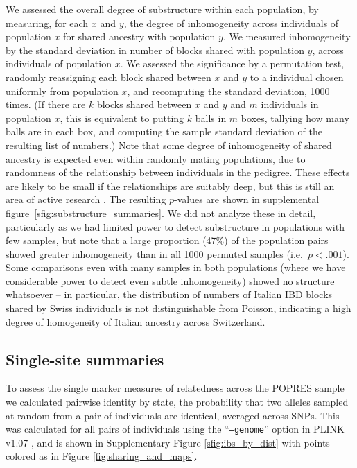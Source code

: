 \documentclass{article}
\begin{document}
We assessed the overall degree of substructure within each population, 
by measuring, for each $x$ and $y$, the degree of inhomogeneity across individuals of population $x$ for shared ancestry with population $y$.
We measured inhomogeneity by the standard deviation in number of blocks shared with population $y$,
across individuals of population $x$.
We assessed the significance by a permutation test,
randomly reassigning each block shared between $x$ and $y$ to a individual chosen uniformly from population $x$,
and recomputing the standard deviation, 1000 times.
(If there are $k$ blocks shared between $x$ and $y$ and $m$ individuals in population $x$,
this is equivalent to putting $k$ balls in $m$ boxes, tallying how many balls are in each box,
and computing the sample standard deviation of the resulting list of numbers.)  
Note that some degree of inhomogeneity of shared ancestry is expected
even within randomly mating populations, due to randomness of the relationship between individuals in the pedigree.
These effects are likely to be small if the relationships are suitably deep, but
this is still an area of active research \citep{henn2012cryptic,carmi2012variance}. 
The resulting $p$-values are shown in supplemental figure~\ref{sfig:substructure_summaries}.
We did not analyze these in detail, particularly as we had limited power to detect substructure in populations with few samples,
but note that a large proportion (47\%) of the population pairs showed greater inhomogeneity than in all 1000 permuted samples (i.e.\ $p<.001$).
Some comparisons even with many samples in both populations (where we have considerable power to detect even subtle inhomogeneity)
showed no structure whatsoever --
in particular, the distribution of numbers of Italian IBD blocks shared by Swiss individuals is not distinguishable from Poisson,
indicating a high degree of homogeneity of Italian ancestry across Switzerland.


\subsection{Single-site summaries}
\label{ss:singlesite}
	
To assess the single marker measures of relatedness across the POPRES sample 
we calculated pairwise identity by state, 
the probability that two alleles sampled at random from a pair of individuals are identical,
averaged across SNPs. 
This was calculated for all pairs of individuals using the ``{\tt --genome}'' option in PLINK v1.07
\citep[][\url{http://pngu.mgh.harvard.edu/purcell/plink}]{purcell2007plink},
and is shown in Supplementary Figure \ref{sfig:ibs_by_dist} with points colored as in Figure \ref{fig:sharing_and_maps}.
\end{document}

